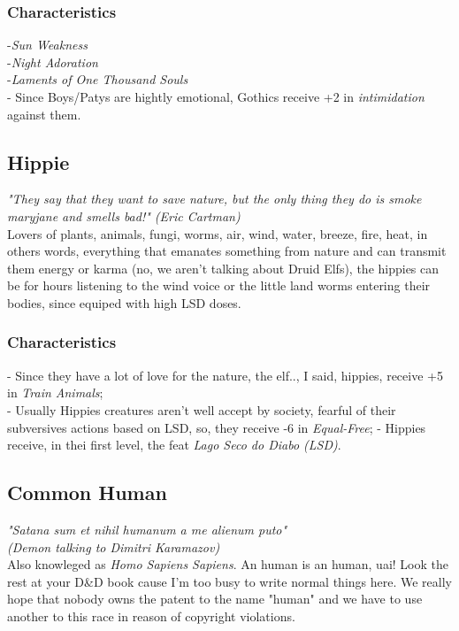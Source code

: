\documentclass[ letterpaper,12pt]{article}
\begin{document}
\subsubsection{Characteristics}
-{\it Sun Weakness}\\
-{\it Night Adoration}\\
-{\it Laments of One Thousand Souls}\\
- Since Boys/Patys are hightly emotional, Gothics receive +2 in {\it intimidation} against them.

\subsection{Hippie}
{\it "They say that they want to save nature, but the only thing they do is smoke maryjane and smells bad!" (Eric Cartman)}\\

Lovers of plants, animals, fungi, worms, air, wind, water, breeze, fire, heat, in others words, everything that emanates something from nature and can transmit them energy or karma (no, we aren't talking about Druid Elfs), the hippies can be for hours listening to the wind voice or the little land worms entering their bodies, since equiped with high LSD doses.\\

\subsubsection{Characteristics}
- Since they have a lot of love for the nature, the elf.., I said, hippies, receive +5 in {\it Train Animals};\\
- Usually Hippies creatures aren't well accept by society, fearful of their subversives actions based on LSD, so, they receive -6 in {\it Equal-Free};
- Hippies receive, in thei first level, the feat {\it Lago Seco do Diabo (LSD)}.

\subsection{Common Human}
{\it "Satana sum et nihil humanum a me alienum puto"\\
 (Demon talking to Dimitri Karamazov)}\\

Also knowleged as {\it Homo Sapiens Sapiens}. An human is an human, uai! Look the rest at your D\&D book cause I'm too busy to write normal things here. We really hope that nobody owns the patent to the name "human" and we have to use another to this race in reason of copyright violations.
\end{document}
